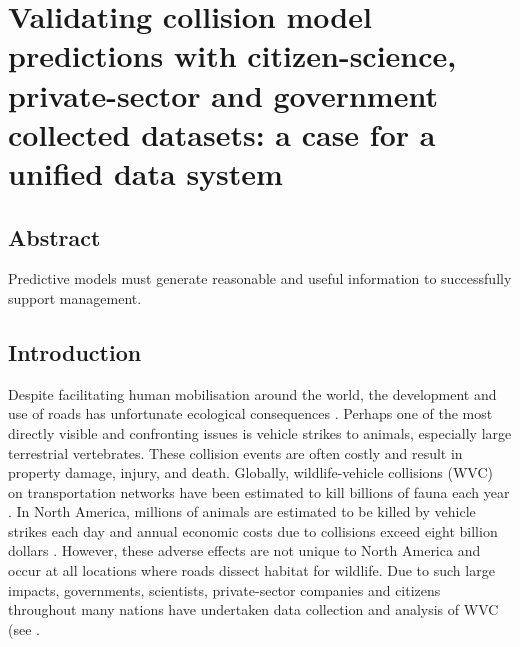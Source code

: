 \chapter{Validating collision model predictions with citizen-science, private-sector and government collected datasets: a case for a unified data system}\label{sec:val}
\newpage

\begin{localsize}{10}
\section*{\centering Abstract}

Predictive models must generate reasonable and useful information to successfully support management.

\end{localsize}

\newpage
\section{Introduction}

Despite facilitating human mobilisation around the world, the development and use of roads has unfortunate ecological consequences \citep{form03}. Perhaps one of the most directly visible and confronting issues is vehicle strikes to animals, especially large terrestrial vertebrates. These collision events are often costly and result in property damage, injury, and death. Globally, wildlife-vehicle collisions (WVC) on transportation networks have been estimated to kill billions of fauna each year \citep{seil06}. In North America, millions of animals are estimated to be killed by vehicle strikes each day \citep{form98} and annual economic costs due to collisions exceed eight billion dollars \citep{huij07b}. However, these adverse effects are not unique to North America and occur at all locations where roads dissect habitat for wildlife. Due to such large impacts, governments, scientists, private-sector companies and citizens throughout many nations have undertaken data collection and analysis of WVC (see \cite{rvdr15}.

